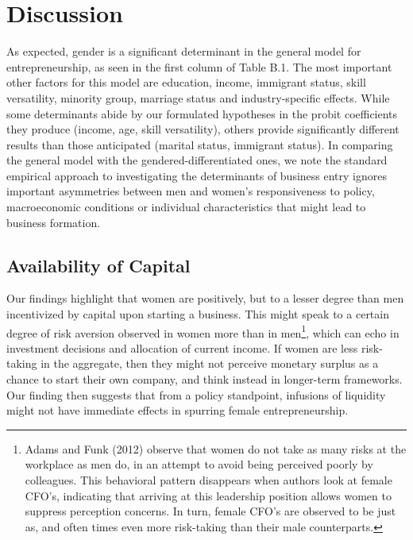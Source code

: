 \chapter{Discussion\label{ch:disc}}

As expected, gender is a significant determinant in the general model for entrepreneurship, as seen in the first column of Table B.1. The most important other factors for this model are education, income, immigrant status, skill versatility, minority group, marriage status and industry-specific effects. While some determinants abide by our formulated hypotheses in the probit coefficients they produce (income, age, skill versatility), others provide significantly different results than those anticipated (marital status, immigrant status). In comparing the general model with the gendered-differentiated ones, we note the standard empirical approach to investigating the determinants of business entry ignores important asymmetries between men and women's responsiveness to policy, macroeconomic conditions or individual characteristics that might lead to business formation. 

\section{Availability of Capital}
Our findings highlight that women are positively, but to a lesser degree than men incentivized by capital upon starting a business. This might speak to a certain degree of risk aversion observed in women more than in men\footnote{ Adams and Funk (2012) observe that women do not take as many risks at the workplace as men do, in an attempt to avoid being perceived poorly by colleagues. This behavioral pattern disappears when authors look at female CFO's, indicating that arriving at this leadership position allows women to suppress perception concerns. In turn, female CFO's are observed to be just as, and often times even more risk-taking than their male counterparts.}, which can echo in investment decisions and allocation of current income. If women are less risk-taking in the aggregate, then they might not perceive monetary surplus as a chance to start their own company, and think instead in longer-term frameworks. Our finding then suggests that from a policy standpoint, infusions of liquidity might not have immediate effects in spurring female entrepreneurship. 

